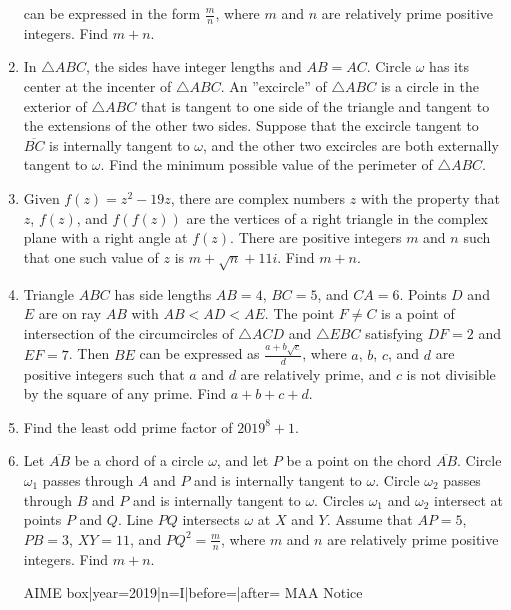 \documentclass{article}
\begin{document}
\begin{enumerate}[label=\arabic*., itemsep=0.5em]
can be expressed in the form $\tfrac{m}{n}$, where $m$ and $n$ are relatively prime positive integers. Find $m+n$.\par \vspace{0.5em}\item In $\triangle ABC$, the sides have integer lengths and $AB=AC$. Circle $\omega$ has its center at the incenter of $\triangle ABC$. An ''excircle'' of $\triangle ABC$ is a circle in the exterior of $\triangle ABC$ that is tangent to one side of the triangle and tangent to the extensions of the other two sides. Suppose that the excircle tangent to $\overline{BC}$ is internally tangent to $\omega$, and the other two excircles are both externally tangent to $\omega$. Find the minimum possible value of the perimeter of $\triangle ABC$.\par \vspace{0.5em}\item Given $f(z) = z^2-19z$, there are complex numbers $z$ with the property that $z$, $f(z)$, and $f(f(z))$ are the vertices of a right triangle in the complex plane with a right angle at $f(z)$. There are positive integers $m$ and $n$ such that one such value of $z$ is $m+\sqrt{n}+11i$. Find $m+n$.\par \vspace{0.5em}\item Triangle $ABC$ has side lengths $AB=4$, $BC=5$, and $CA=6$. Points $D$ and $E$ are on ray $AB$ with $AB<AD<AE$. The point $F \neq C$ is a point of intersection of the circumcircles of $\triangle ACD$ and $\triangle EBC$ satisfying $DF=2$ and $EF=7$. Then $BE$ can be expressed as $\tfrac{a+b\sqrt{c}}{d}$, where $a$, $b$, $c$, and $d$ are positive integers such that $a$ and $d$ are relatively prime, and $c$ is not divisible by the square of any prime. Find $a+b+c+d$.\par \vspace{0.5em}\item Find the least odd prime factor of $2019^8 + 1$.\par \vspace{0.5em}\item Let $\overline{AB}$ be a chord of a circle $\omega$, and let $P$ be a point on the chord $\overline{AB}$. Circle $\omega_1$ passes through $A$ and $P$ and is internally tangent to $\omega$. Circle $\omega_2$ passes through $B$ and $P$ and is internally tangent to $\omega$. Circles $\omega_1$ and $\omega_2$ intersect at points $P$ and $Q$. Line $PQ$ intersects $\omega$ at $X$ and $Y$. Assume that $AP=5$, $PB=3$, $XY=11$, and $PQ^2 = \tfrac{m}{n}$, where $m$ and $n$ are relatively prime positive integers. Find $m+n$.



{{AIME box|year=2019|n=I|before=|after=}}
{{MAA Notice}}\par \vspace{0.5em}\end{enumerate}
\end{document}

